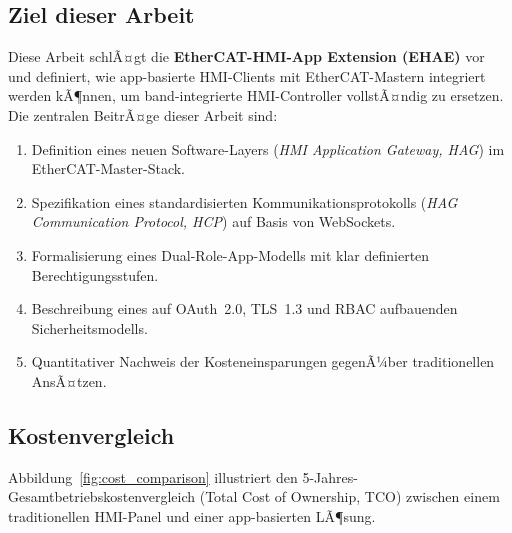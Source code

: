 ﻿\documentclass[12pt,a4paper]{article}
\begin{document}
\subsection{Ziel dieser Arbeit}

Diese Arbeit schlÃ¤gt die \textbf{EtherCAT-HMI-App Extension (EHAE)} vor und definiert,
wie app-basierte HMI-Clients mit EtherCAT-Mastern integriert werden kÃ¶nnen, um
band-integrierte HMI-Controller vollstÃ¤ndig zu ersetzen. Die zentralen BeitrÃ¤ge dieser
Arbeit sind:

\begin{enumerate}[leftmargin=2em]
  \item Definition eines neuen Software-Layers (\emph{HMI Application Gateway, HAG})
    im EtherCAT-Master-Stack.
  \item Spezifikation eines standardisierten Kommunikationsprotokolls (\emph{HAG
    Communication Protocol, HCP}) auf Basis von WebSockets.
  \item Formalisierung eines Dual-Role-App-Modells mit klar definierten
    Berechtigungsstufen.
  \item Beschreibung eines auf OAuth~2.0, TLS~1.3 und RBAC aufbauenden
    Sicherheitsmodells.
  \item Quantitativer Nachweis der Kosteneinsparungen gegenÃ¼ber traditionellen AnsÃ¤tzen.
\end{enumerate}

\subsection{Kostenvergleich}

Abbildung~\ref{fig:cost_comparison} illustriert den 5-Jahres-Gesamtbetriebskostenvergleich
(Total Cost of Ownership, TCO) zwischen einem traditionellen HMI-Panel und einer
app-basierten LÃ¶sung.
\end{document}
